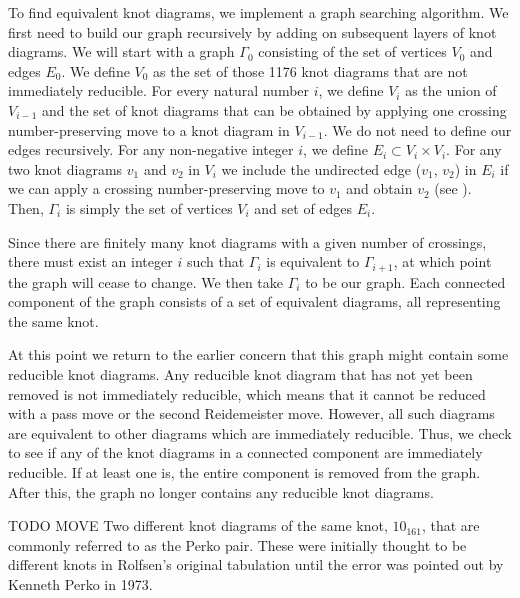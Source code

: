 \begin{paper}

To find equivalent knot diagrams, we implement a graph searching algorithm.
We first need to build our graph recursively by adding on subsequent layers of
knot diagrams.
We will start with a graph $\Gamma_0$ consisting of the set of vertices $V_0$
and edges $E_0$.
We define $V_0$ as the set of those 1176 knot diagrams that are not immediately
reducible.
For every natural number $i$, we define $V_i$ as the union of $V_{i-1}$ and the
set of knot diagrams that can be obtained by applying one crossing
number-preserving move to a knot diagram in $V_{i-1}$.
We do not need to define our edges recursively.
For any non-negative integer $i$, we define $E_i\subset V_i\times V_i$.
For any two knot diagrams $v_1$ and $v_2$ in $V_i$ we include the undirected
edge ($v_1$, $v_2$) in $E_i$ if we can apply a crossing number-preserving move
to $v_1$ and obtain $v_2$ (see \figMoves).
Then, $\Gamma_i$ is simply the set of vertices $V_i$ and set of edges $E_i$.

Since there are finitely many knot diagrams with a given number of crossings,
there must exist an integer $i$ such that $\Gamma_i$ is equivalent to
$\Gamma_{i+1}$, at which point the graph will cease to change.
We then take $\Gamma_i$ to be our graph.
Each connected component of the graph consists of a set of equivalent diagrams,
all representing the same knot.

At this point we return to the earlier concern that this graph might contain
some reducible knot diagrams.
Any reducible knot diagram that has not yet been removed is not immediately
reducible, which means that it cannot be reduced with a pass move or the second
Reidemeister move.
However, all such diagrams are equivalent to other diagrams which are
immediately reducible.
Thus, we check to see if any of the knot diagrams in a connected component are
immediately reducible.
If at least one is, the entire component is removed from the graph.
After this, the graph no longer contains any reducible knot diagrams.

TODO MOVE
{Two different knot diagrams of the same knot, $10_{161}$, that are commonly
referred to as the Perko pair.
These were initially thought to be different knots in Rolfsen's original
tabulation until the error was pointed out by Kenneth Perko in 1973.}


\end{paper}
